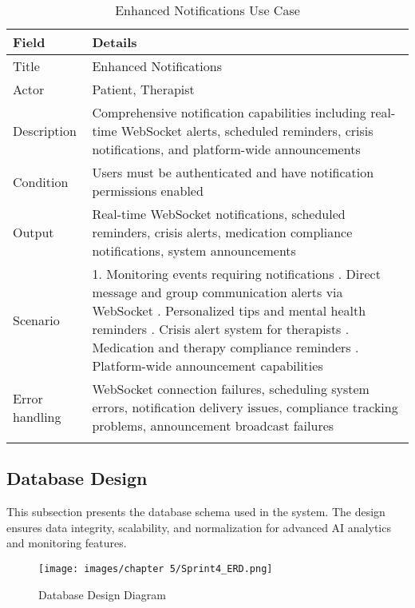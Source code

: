 \begin{longtable}{|p{3cm}|p{12cm}|}
\hline
\textbf{Field} & \textbf{Details} \\
\hline
Title & Enhanced Notifications \\
\hline
Actor & Patient, Therapist \\
\hline
Description & Comprehensive notification capabilities including real-time WebSocket alerts, scheduled reminders, crisis notifications, and platform-wide announcements \\
\hline
Condition & Users must be authenticated and have notification permissions enabled \\
\hline
Output & Real-time WebSocket notifications, scheduled reminders, crisis alerts, medication compliance notifications, system announcements \\
\hline
Scenario & 1. Monitoring events requiring notifications \newline 2. Direct message and group communication alerts via WebSocket \newline 3. Personalized tips and mental health reminders \newline 4. Crisis alert system for therapists \newline 5. Medication and therapy compliance reminders \newline 6. Platform-wide announcement capabilities \\
\hline
Error handling & WebSocket connection failures, scheduling system errors, notification delivery issues, compliance tracking problems, announcement broadcast failures \\
\hline
\caption{Enhanced Notifications Use Case}
\end{longtable}

 

\subsection{Database Design}

This subsection presents the database schema used in the system. The design ensures data integrity, scalability, and normalization for advanced AI analytics and monitoring features.
 
\begin{figure}[H]
    \centering
    \texttt{[image: images/chapter 5/Sprint4\_ERD.png]}
    \caption{Database Design Diagram}
    \label{fig:database-design-sprint4}
\end{figure}

